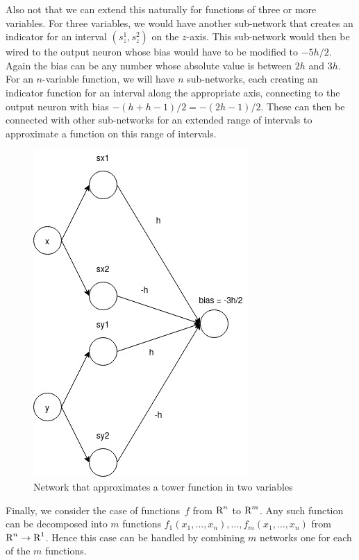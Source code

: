 Also not that we can extend this naturally for functions of three or more variables. For three 
variables, we would have another sub-network that creates an indicator for an interval 
$(s_z^1, s_z^2)$ on the $z$-axis. This sub-network would then be wired to the output neuron whose
bias would have to be modified to $-5h/2$. Again the bias can be any number whose absolute value 
is between $2h$ and $3h$. For an $n$-variable function, we will have $n$ sub-networks, each 
creating an indicator function for an interval along the appropriate axis, connecting 
to the output neuron with bias $- (h + h - 1)/2 = - (2h - 1) / 2$. These can then be connected 
with other sub-networks for an extended range of intervals to approximate a function on this
range of intervals.     
\begin{figure}[ht]
\begin{center}
\includegraphics[scale=0.5]{TowerFunction.jpg}
\end{center}
\caption{Network that approximates a tower function in two variables}
\label{fig:tower_function}
\end{figure}

Finally, we consider the case of functions~$f$ from $\text{R}^n$ to $\text{R}^m$. Any such function can be 
decomposed into $m$ functions $f_1(x_1, \ldots, x_n), \ldots, f_m(x_1, \ldots, x_n)$ 
from $\text{R}^n \to \text{R}^1$. Hence this case can be handled by combining 
$m$ networks one for each of the $m$ functions.  



